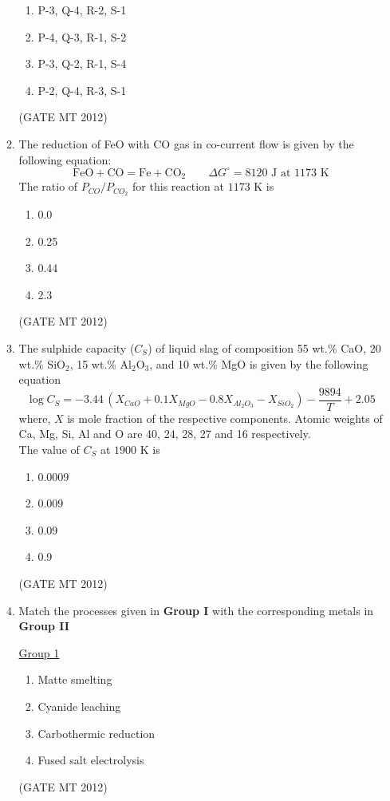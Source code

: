 \documentclass[journal, 11pt, onecolumn]{IEEEtran}
\theoremstyle{remark}
\begin{document}
\begin{enumerate}
\begin{enumerate}
\begin{multicols}{2}
\begin{enumerate}
\item P-3, Q-4, R-2, S-1
\item P-4, Q-3, R-1, S-2
\item P-3, Q-2, R-1, S-4
\item P-2, Q-4, R-3, S-1
\end{enumerate}
\end{multicols}
\hfill(GATE MT 2012)

\item The reduction of FeO with CO gas in co-current flow is given by the following equation: \\
\[
    \text{FeO} + \text{CO} = \text{Fe} + \text{CO}_2 \qquad \Delta G^\circ = 8120 \text{ J at 1173 K}
\]
The ratio of $P_{CO}/P_{CO_2}$ for this reaction at $1173$ K is

\begin{multicols}{2}
\begin{enumerate}  
\item 0.0
\item 0.25
\item 0.44
\item 2.3
\end{enumerate}
\end{multicols}
\hfill(GATE MT 2012)

\item The sulphide capacity ($C_S$) of liquid slag of composition 55 wt.\% CaO, 20 wt.\% SiO$_2$, 15 wt.\% Al$_2$O$_3$, and 10 wt.\% MgO is given by the following equation \\
\[
    \log C_S = -3.44 \, (X_{CaO} + 0.1 X_{MgO} - 0.8 X_{Al_2O_3} - X_{SiO_2}) - \frac{9894}{T} + 2.05
\]
where, $X$ is mole fraction of the respective components. Atomic weights of Ca, Mg, Si, Al and O are 40, 24, 28, 27 and 16 respectively. \\
The value of $C_S$ at $1900$ K is
\begin{multicols}{2}
\begin{enumerate}  
\item 0.0009
\item 0.009
\item 0.09
\item 0.9
\end{enumerate}
\end{multicols}
\hfill(GATE MT 2012)

\item Match the processes given in \textbf{Group I} with the corresponding metals in \textbf{Group II}
\begin{multicols}{2}
\underline{Group 1}
\begin{enumerate}[label=(\Alph*), start=16]
\item Matte smelting   
\item Cyanide leaching
\item Carbothermic reduction 
\item Fused salt electrolysis
\end{enumerate}
\hfill(GATE MT 2012)


\end{multicols}
\end{enumerate}
\end{enumerate}
\end{document}
